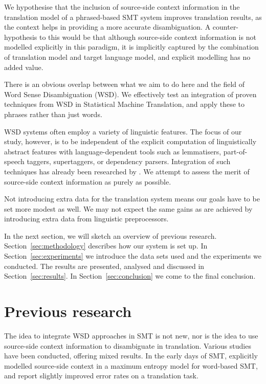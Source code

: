 We hypothesise that the inclusion of source-side context information in the
translation model of a phrased-based SMT system improves translation results,
as the context helps in providing a more accurate disambiguation. A
counter-hypothesis to this would be that although source-side context
information is not modelled explicitly in this paradigm, it is implicitly captured by the
combination of translation model and target language model, and explicit
modelling has no added value.

There is an obvious overlap between what we aim to do here and the field of
Word Sense Disambiguation (WSD). We effectively test an integration of proven
techniques from WSD in Statistical Machine Translation, and apply these to
phrases rather than just words.

WSD systems often employ a variety of linguistic features. The focus of our
study, however, is to be independent of the explicit computation of
linguistically abstract features with language-dependent tools such as
lemmatisers, part-of-speech taggers, supertaggers, or dependency parsers.
Integration of such techniques has already been researched by \cite{Rejwanul+11}.
We attempt to assess the merit of source-side context information as purely as possible.

Not introducing extra data for the translation system means our goals have to
be set more modest as well. We may not expect the same gains as are achieved by
introducing extra data from linguistic preprocessors.

In the next section, we will sketch an overview of previous research.
Section~\ref{sec:methodology} describes how our system is set up. In
Section~\ref{sec:experiments} we introduce the data sets used and the
experiments we conducted. The results are presented, analysed and
discussed in Section~\ref{sec:results}. In Section~\ref{sec:conclusion} we come
to the final conclusion.

\section{Previous research}

The idea to integrate WSD approaches in SMT is not new, nor is the idea to use
source-side context information to disambiguate in translation. Various studies
have been conducted, offering mixed results. In the early days of SMT,
\cite{GarciaVarea+02} explicitly modelled source-side context in a
maximum entropy model for word-based SMT, and report slightly improved error
rates on a translation task.

